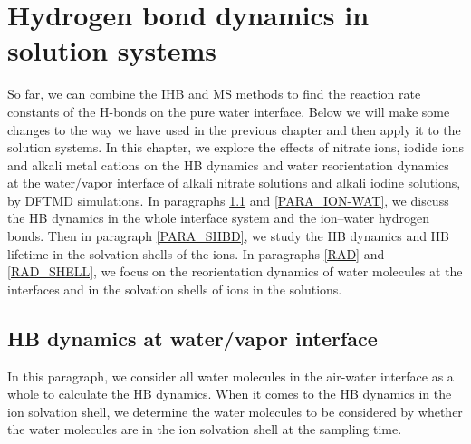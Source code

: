 \chapter{Hydrogen bond dynamics in solution systems}\label{CHAPTER_HB_SOLUTIONS}
So far, we can combine the IHB and MS methods to find the reaction rate constants of the H-bonds on the pure water interface. 
Below we will make some changes to the way we have used in the previous chapter and then apply it to the solution systems.
In this chapter, we explore the effects of nitrate ions, iodide ions and alkali metal cations 
on the HB dynamics and water reorientation dynamics at the water/vapor interface of alkali nitrate solutions and alkali
iodine solutions, by DFTMD simulations. %
In paragraphs \ref{HBD_ITP} and \ref{PARA_ION-WAT}, we discuss the HB dynamics in the whole interface system and the ion--water hydrogen bonds. 
Then in paragraph \ref{PARA_SHBD}, we study the HB dynamics and HB lifetime in the solvation shells of the ions.
In paragraphs \ref{RAD} and \ref{RAD_SHELL}, we focus on the reorientation dynamics of water molecules at the interfaces
and in the solvation shells of ions in the solutions.

\section{HB dynamics at water/vapor interface}\label{HBD_ITP}
In this paragraph, we consider all water molecules in the air-water interface as a whole to calculate the HB dynamics. 
When it comes to the HB dynamics in the ion solvation shell, 
we determine the water molecules to be considered by whether the water molecules are in the ion solvation shell
at the sampling time.
